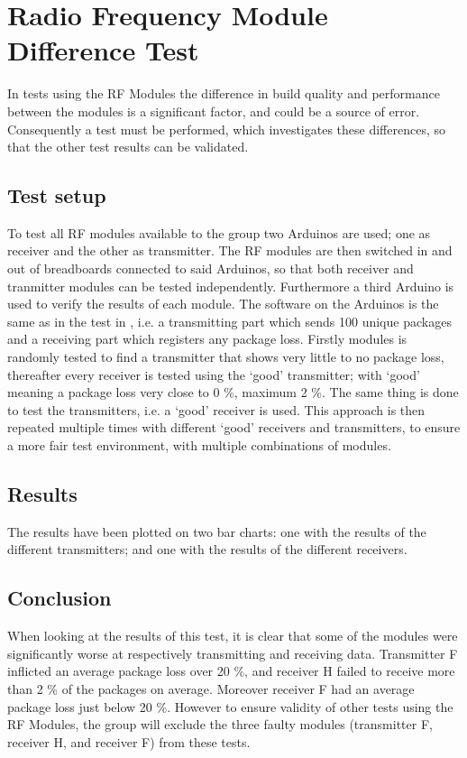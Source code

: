 \section{Radio Frequency Module Difference Test}\label{sec:RFMD}
In tests using the RF Modules the difference in build quality and performance between the modules is a significant factor, and could be a source of error.
Consequently a test must be performed, which investigates these differences, so that the other test results can be validated.

\subsection{Test setup}
To test all RF modules available to the group two Arduinos are used; one as receiver and the other as transmitter.
The RF modules are then switched in and out of breadboards connected to said Arduinos, so that both receiver and tranmitter modules can be tested independently.
Furthermore a third Arduino is used to verify the results of each module.
The software on the Arduinos is the same as in the test in , i.e. a transmitting part which sends 100 unique packages and a receiving part which registers any package loss. 
Firstly modules is randomly tested to find a transmitter that shows very little to no package loss, thereafter every receiver is tested using the \enquote*{good} transmitter; with \enquote*{good} meaning a package loss very close to 0 \%, maximum 2 \%.
The same thing is done to test the transmitters, i.e. a \enquote*{good} receiver is used.
This approach is then repeated multiple times with different \enquote*{good} receivers and transmitters, to ensure a more fair test environment, with multiple combinations of modules.

\subsection{Results}
The results have been plotted on two bar charts: one with the results of the different transmitters; 
and one with the results of the different receivers.

\subsection{Conclusion}
When looking at the results of this test, it is clear that some of the modules were significantly worse at respectively transmitting and receiving data.
Transmitter \textsf{F} inflicted an average package loss over 20 \%, and receiver \textsf{H} failed to receive more than 2 \% of the packages on average.
Moreover receiver \textsf{F} had an average package loss just below 20 \%.
However to ensure validity of other tests using the RF Modules, the group will exclude the three faulty modules (transmitter \textsf{F}, receiver \textsf{H}, and receiver \textsf{F}) from these tests.
